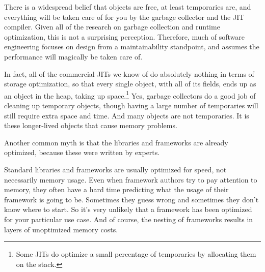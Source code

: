 \begin{comment}
\callout{myth0}{Memory is Cheap.}{
Since memory is so cheap, you do not have to think of memory as a finite
resource.}
Buying more memory at the last minute to fix a severe scalability problem is rarely an option, especially
if the off by an order of magnitude from what was planned.  And no
amount of additional memory will fix a memory leak over time. Adding a large amount of memory can also have
a negative impact on performance, such as on the operation of the garbage collector, and could hit up against physical
contraints in the system architecture.
\end{comment}


There is a widespread belief that objects are free, at least temporaries are, 
and everything will be taken care of for you by the garbage collector and the JIT compiler.
Given all of the research on garbage collection and runtime optimization, this
is not a surprising perception. Therefore, much of software engineering focuses on
design from a maintainability standpoint, and assumes the performance will
magically be taken care of.

In fact, all of the commercial JITs
we know of do absolutely nothing in terms of storage optimization, so
that every single object, with all of its fields, ends up as an object in the
heap, taking up space.\footnote{Some JITs do optimize a
small percentage of temporaries by allocating them on the stack.} 
Yes, garbage collectors do a good job of cleaning up temporary objects, though having a large number of
temporaries will still require extra space and time. And many objects are not
temporaries. It is these longer-lived objects that cause memory problems. 


{Another common myth is that the libraries and frameworks are already optimized,
because these were written by experts.
} 

Standard libraries and frameworks are usually optimized for speed, not
necessarily memory usage. Even when framework authors try to pay attention to
memory, they often have a hard time predicting what the usage of their
framework is going to be. Sometimes they guess wrong and sometimes they don't
know where to start.  So it's very unlikely that a framework has been optimized for
your particular use case.  And of course, the nesting of frameworks results in
layers of unoptimized memory costs.

